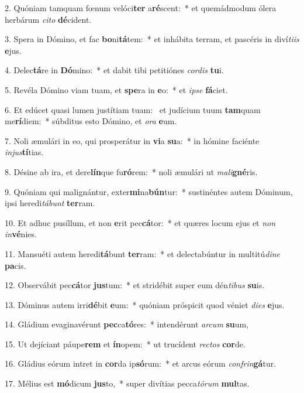 2. Quóniam tamquam fœnum velóci\textbf{ter} a\textbf{ré}scent:~*  et quemádmodum ólera herbárum \textit{ci}\textit{to} \textbf{dé}cident.\

3. Spera in Dómino, et fac \textbf{bo}ni\textbf{tá}tem:~*  et inhábita terram, et pascéris in diví\textit{ti}\textit{is} \textbf{e}jus.\

4. Delec\textbf{tá}re in \textbf{Dó}mino:~*  et dabit tibi petitiónes \textit{cor}\textit{dis} \textbf{tu}i.\

5. Revéla Dómino viam tuam, et \textbf{spe}ra in \textbf{e}o:~*  et \textit{ip}\textit{se} \textbf{fá}ciet.\

6. Et edúcet quasi lumen justítiam tuam: \dag\  et judícium tuum \textbf{tam}quam me\textbf{rí}diem:~*  súbditus esto Dómino, et \textit{o}\textit{ra} \textbf{e}um.\

7. Noli æmulári in eo, qui prosperátur in \textbf{vi}a \textbf{su}a:~*  in hómine faciénte \textit{in}\textit{jus}\textbf{tí}tias.\

8. Désine ab ira, et dere\textbf{lín}que fu\textbf{ró}rem:~*  noli æmulári ut \textit{ma}\textit{li}\textbf{gné}ris.\

9. Quóniam qui malignántur, exter\textbf{mi}na\textbf{bún}tur:~*  sustinéntes autem Dóminum, ipsi heredi\textit{tá}\textit{bunt} \textbf{ter}ram.\

10. Et adhuc pusíllum, et non \textbf{e}rit pec\textbf{cá}tor:~*  et quæres locum ejus et \textit{non} \textit{in}\textbf{vé}nies.\

11. Mansuéti autem heredi\textbf{tá}bunt \textbf{ter}ram:~*  et delectabúntur in multitú\textit{di}\textit{ne} \textbf{pa}cis.\

12. Observábit pec\textbf{cá}tor \textbf{jus}tum:~*  et stridébit super eum dén\textit{ti}\textit{bus} \textbf{su}is.\

13. Dóminus autem irri\textbf{dé}bit \textbf{e}um:~*  quóniam próspicit quod véniet \textit{di}\textit{es} \textbf{e}jus.\

14. Gládium evaginavérunt \textbf{pec}ca\textbf{tó}res:~*  intendérunt \textit{ar}\textit{cum} \textbf{su}um,\

15. Ut dejíciant páupe\textbf{rem} et \textbf{ín}opem:~*  ut trucídent \textit{rec}\textit{tos} \textbf{cor}de.\

16. Gládius eórum intret in \textbf{cor}da ip\textbf{só}rum:~*  et arcus eórum \textit{con}\textit{frin}\textbf{gá}tur.\

17. Mélius est \textbf{mó}dicum \textbf{jus}to,~*  super divítias pecca\textit{tó}\textit{rum} \textbf{mul}tas.\

